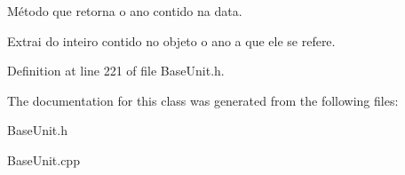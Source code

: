 Método que retorna o ano contido na data. 

Extrai do inteiro contido no objeto o ano a que ele se refere. 

Definition at line 221 of file Base\-Unit.\-h.



The documentation for this class was generated from the following files\-:\begin{DoxyCompactItemize}
\item 
Base\-Unit.\-h\item 
Base\-Unit.\-cpp\end{DoxyCompactItemize}
